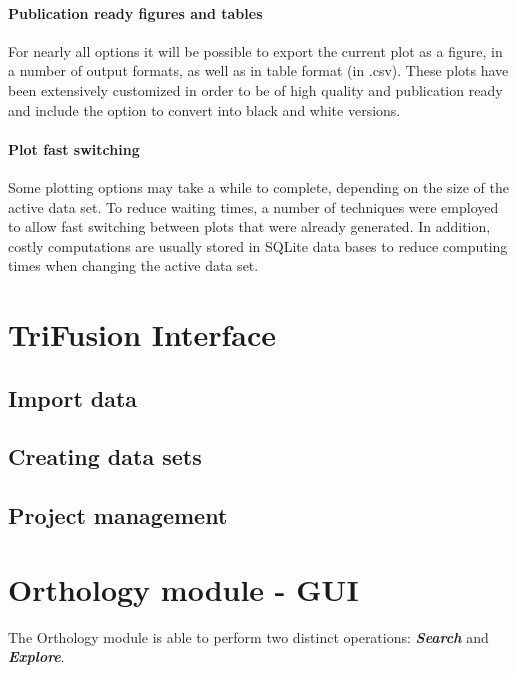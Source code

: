 \documentclass[12pt]{article}
\begin{document}
\paragraph{Publication ready figures and tables}

For nearly all options it will be possible to export the current plot as a figure, in a number of output formats, as well as in table format (in .csv). These plots have been extensively customized in order to be of high quality and publication ready and include the option to convert into black and white versions.

\paragraph{Plot fast switching}

Some plotting options may take a while to complete, depending on the size of the active data set. To reduce waiting times, a number of techniques were employed to allow fast switching between plots that were already generated. In addition, costly computations are usually stored in SQLite data bases to reduce computing times when changing the active data set.


\section{TriFusion Interface}

\subsection{Import data}

\subsection{Creating data sets}

\subsection{Project management}


\section{Orthology module - GUI}

The Orthology module is able to perform two distinct operations: \textbf{\textit{Search}} and \textbf{\textit{Explore}}. 
\end{document}
